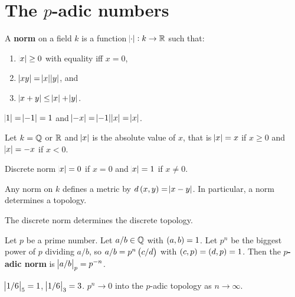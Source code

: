 \section{The \texorpdfstring{$ p $}{p}-adic numbers}

\begin{definition}
A \textbf{norm} on a field $ k $ is a function $ \abs{\cdot} : k \to \mathbb{R} $ such that:
\begin{enumerate}
\item $ \abs{x} \ge 0 $ with equality iff $ x = 0 $,
\item $ \abs{xy} = \abs{x}\abs{y} $, and
\item $ \abs{x + y} \le \abs{x} + \abs{y} $.
\end{enumerate}
\end{definition}

\begin{note*}
$ \abs{1} = \abs{-1} = 1 $ and $ \abs{-x} = \abs{-1}\abs{x} = \abs{x} $.
\end{note*}

\begin{example*}
Let $ k = \mathbb{Q} $ or $ \mathbb{R} $ and $ \abs{x} $ is the absolute value of $ x $, that is $ \abs{x} = x $ if $ x \ge 0 $ and $ \abs{x} = -x $ if $ x < 0 $.
\end{example*}

\begin{example*}
Discrete norm $ \abs{x} = 0 $ if $ x = 0 $ and $ \abs{x} = 1 $ if $ x \ne 0 $.
\end{example*}

\begin{remark}
Any norm on $ k $ defines a metric by $ d\br{x, y} = \abs{x - y} $. In particular, a norm determines a topology.
\end{remark}

\begin{example*}
The discrete norm determines the discrete topology.
\end{example*}

\begin{definition}
Let $ p $ be a prime number. Let $ a / b \in \mathbb{Q} $ with $ \br{a, b} = 1 $. Let $ p^n $ be the biggest power of $ p $ dividing $ a / b $, so $ a / b = p^n \br{c / d} $ with $ \br{c, p} = \br{d, p} = 1 $. Then the \textbf{$ p $-adic norm} is $ \abs{a / b}_p = p^{-n} $.
\end{definition}

\begin{example*}
$ \abs{1 / 6}_5 = 1 $, $ \abs{1 / 6}_3 = 3 $. $ p^n \to 0 $ into the $ p $-adic topology as $ n \to \infty $.
\end{example*}

